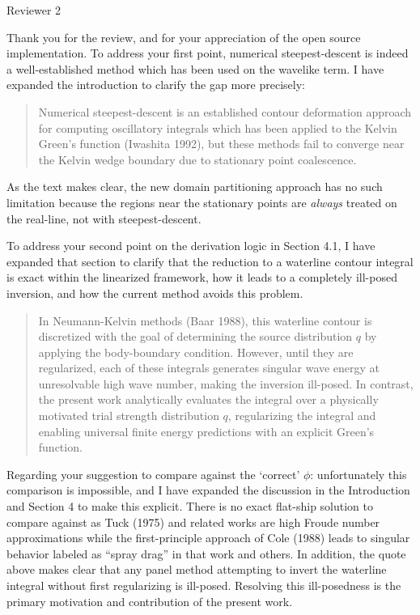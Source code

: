 \documentclass[12pt]{letter}
\begin{document}
Reviewer 2
\vspace{1cm}

Thank you for the review, and for your appreciation of the open source implementation. To address your first point, numerical steepest-descent is indeed a well-established method which has been used on the wavelike term. I have expanded the introduction to clarify the gap more precisely:
\begin{quote}
Numerical steepest-descent is an established contour deformation approach for computing oscillatory integrals which has been applied to the Kelvin Green's function (Iwashita 1992), but these methods fail to converge near the Kelvin wedge boundary due to stationary point coalescence.
\end{quote}
As the text makes clear, the new domain partitioning approach has no such limitation because the regions near the stationary points are \textit{always} treated on the real-line, not with steepest-descent.

To address your second point on the derivation logic in Section 4.1, I have expanded that section to clarify that the reduction to a waterline contour integral is exact within the linearized framework, how it leads to a completely ill-posed inversion, and how the current method avoids this problem. 
\begin{quote}
In Neumann-Kelvin methods (Baar 1988), this waterline contour is discretized with the goal of determining the source distribution $q$ by applying the body-boundary condition. However, until they are regularized, each of these integrals generates singular wave energy at unresolvable high wave number, making the inversion ill-posed. In contrast, the present work analytically evaluates the integral over a physically motivated trial strength distribution $q$, regularizing the integral and enabling universal finite energy predictions with an explicit Green's function.
\end{quote}

Regarding your suggestion to compare against the `correct' $\phi$: unfortunately this comparison is impossible, and I have expanded the discussion in the Introduction and Section 4 to make this explicit. There is no exact flat-ship solution to compare against as Tuck (1975) and related works are high Froude number approximations while the first-principle approach of Cole (1988) leads to singular behavior labeled as ``spray drag'' in that work and others. In addition, the quote above makes clear that any panel method attempting to invert the waterline integral without first regularizing is ill-posed. Resolving this ill-posedness is the primary motivation and contribution of the present work.
\end{document}
